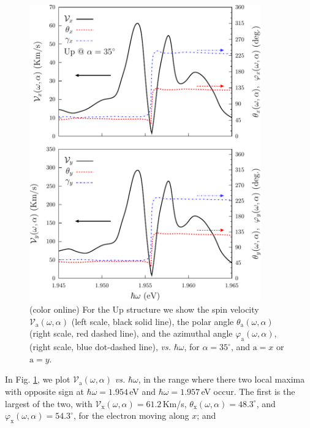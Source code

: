 \documentclass[floatfix,prb,aps,superscriptaddress,showpacs,11pt,preprint,letterpaper]{revtex4}
\def\tama{10cm}
\begin{document}
\begin{figure}[t]
\centering
\includegraphics[width=\tama]{fig8}
\caption{(color online) For the Up structure we show the spin velocity
$\mathcal{V}_{\mathrm{a}} (\omega,\alpha)$ (left scale, black solid line), the polar
angle $\theta_{\mathrm{a}} (\omega,\alpha)$ (right scale, red dashed  line), and the
azimuthal angle $\varphi_{\mathrm{a}} (\omega,\alpha)$, (right scale, blue dot-dashed 
line), {\it vs.} $\hbar\omega$, for $\alpha=35^\circ$, and $\mathrm{a}=x$ or
$\mathrm{a}=y$. }
\label{fig:up-vx-vy-w2}
\end{figure}
In Fig. \ref{fig:up-vx-vy-w2}, we plot $\mathcal{V}_{\mathrm{a}}
(\omega,\alpha)$ {\it vs.} $\hbar\omega$, in the range where there two local maxima
with opposite sign at $\hbar\omega=1.954$\,eV and $\hbar\omega=1.957$\,eV
occur. The first is the largest of the two, with $\mathcal{V}_{\mathrm{x}}
(\omega,\alpha)=61.2$\,Km/s, $\theta_{\mathrm{x}}
(\omega,\alpha)=48.3^{\circ}$, and $\varphi_{\mathrm{x}}
(\omega,\alpha)=54.3^{\circ}$, for the electron moving along $x$; and
\end{document}
